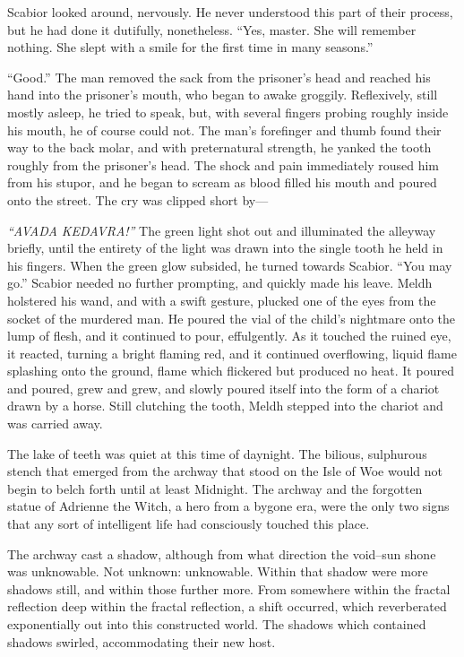 Scabior looked around, nervously. He never understood this part of their process, but he had done it dutifully, nonetheless. “Yes, master. She will remember nothing. She slept with a smile for the first time in many seasons.”

“Good.” The man removed the sack from the prisoner’s head and reached his hand into the prisoner’s mouth, who began to awake groggily. Reflexively, still mostly asleep, he tried to speak, but, with several fingers probing roughly inside his mouth, he of course could not. The man’s forefinger and thumb found their way to the back molar, and with preternatural strength, he yanked the tooth roughly from the prisoner’s head. The shock and pain immediately roused him from his stupor, and he began to scream as blood filled his mouth and poured onto the street. The cry was clipped short by\mbox{---}

\emph{“AVADA KEDAVRA!”}
\SmallVSpace
The green light shot out and illuminated the alleyway briefly, until the entirety of the light was drawn into the single tooth he held in his fingers. When the green glow subsided, he turned towards Scabior. “You may go.”
\SmallVSpace
Scabior needed no further prompting, and quickly made his leave.
\SomeVSpace
Meldh holstered his wand, and with a swift gesture, plucked one of the eyes from the socket of the murdered man. He poured the vial of the child’s nightmare onto the lump of flesh, and it continued to pour, effulgently. As it touched the ruined eye, it reacted, turning a bright flaming red, and it continued overflowing, liquid flame splashing onto the ground, flame which flickered but produced no heat. It poured and poured, grew and grew, and slowly poured itself into the form of a chariot drawn by a horse. Still clutching the tooth, Meldh stepped into the chariot and was carried away.

\simpleline


The lake of teeth was quiet at this time of daynight. The bilious, sulphurous stench that emerged from the archway that stood on the Isle of Woe would not begin to belch forth until at least Midnight. The archway and the forgotten statue of Adrienne the Witch, a hero from a bygone era, were the only two signs that any sort of intelligent life had consciously touched this place.

The archway cast a shadow, although from what direction the void\mbox{--}sun shone was unknowable. Not unknown: unknowable. Within that shadow were more shadows still, and within those further more. From somewhere within the fractal reflection deep within the fractal reflection, a shift occurred, which reverberated exponentially out into this constructed world. The shadows which contained shadows swirled, accommodating their new host.

